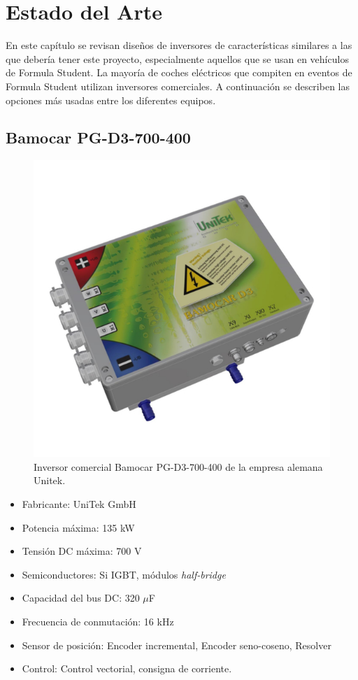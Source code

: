 \chapter{Estado del Arte}

En este capítulo se revisan diseños de inversores de características similares a las que debería tener este proyecto, especialmente aquellos que se usan en vehículos de Formula Student. La mayoría de coches eléctricos que compiten en eventos de Formula Student utilizan inversores comerciales. A continuación se describen las opciones más usadas entre los diferentes equipos.

\section{Bamocar PG-D3-700-400}
\begin{figure}[H]
	\centering
	\includegraphics[width=0.7\linewidth]{fig/unitek}
	\caption{Inversor comercial Bamocar PG-D3-700-400 de la empresa alemana Unitek.}
	\label{fig:unitek}
\end{figure}

\begin{itemize}
	\item Fabricante: UniTek GmbH
	\item Potencia máxima: 135 kW
	\item Tensión DC máxima: 700 V
	\item Semiconductores: Si IGBT, módulos \textit{half-bridge}
	\item Capacidad del bus DC: 320 $\mu$F
	\item Frecuencia de conmutación: 16 kHz
	\item Sensor de posición: Encoder incremental, Encoder seno-coseno, Resolver
	\item Control: Control vectorial, consigna de corriente.
\end{itemize}

